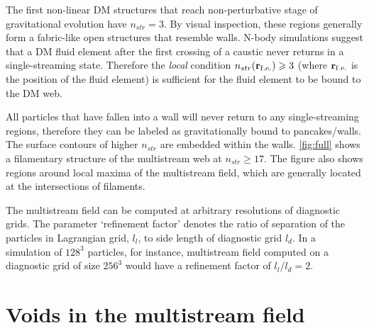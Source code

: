 \documentclass[fleqn,usenatbib,useAMS]{mnras}
\begin{document}
The first non-linear DM structures that reach non-perturbative stage of gravitational evolution have $n_{str} = 3$. By visual inspection, these regions generally form a fabric-like open structures that resemble walls. N-body simulations suggest that a DM fluid element after the first 
crossing of a caustic never returns in  a single-streaming state. Therefore the {\it local} condition $n_{str}({\bf r}_{\rm f.e.}) \geq 3$
(where  ${\bf r}_{\rm f.e.}$ is the position of the fluid element) is  sufficient for the fluid element to be bound to the DM web.

All particles that have fallen into a wall will never return to any single-streaming regions, therefore they can be labeled as gravitationally bound to pancakes/walls. The surface contours of higher $n_{str}$ are embedded within the walls. \autoref{fig:full} shows a filamentary structure of the multistream web at $n_{str} \geq 17$. The figure also shows regions around local maxima of the multistream field, which are generally located at the intersections of filaments.    


The multistream field can be computed at arbitrary resolutions of diagnostic grids. The parameter `refinement factor' denotes the ratio of separation of the particles in Lagrangian grid, $l_l$, to side length of diagnostic grid $l_d$. In a simulation of $128^3$ particles, for instance, multistream field computed on a diagnostic grid of size $256^3$ would have a refinement factor of $l_l/l_d = 2$. 

\section{Voids in the multistream field}
\label{sec:voids}
\end{document}

